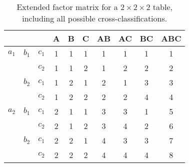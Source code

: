 \begin{table}[htb]
 \caption[Extended factor matrix for a $2\times 2\times2$ table]%
         {Extended factor matrix for a $2\times 2\times2$ table, including all possible cross-classifications.}\label{tab:mcadesign}\vspace{5pt}
\begin{center}
\begin{tabular}{lll | ccc ccc c}
 \hline
       &       &        &  A  &  B  &  C  &  AB &  AC &  BC & ABC \\ \hline
 $a_1$ & $b_1$ & $c_1$  &  1  &  1  &  1  &  1  &  1  &  1  &  1 \\
       &       & $c_2$  &  1  &  1  &  2  &  1  &  2  &  2  &  2 \\
       & $b_2$ & $c_1$  &  1  &  2  &  1  &  2  &  1  &  3  &  3 \\
       &       & $c_2$  &  1  &  2  &  2  &  2  &  2  &  4  &  4 \\
%
 $a_2$ & $b_1$ & $c_1$  &  2  &  1  &  1  &  3  &  3  &  1  &  5 \\
       &       & $c_2$  &  2  &  1  &  2  &  3  &  4  &  2  &  6 \\
       & $b_2$ & $c_1$  &  2  &  2  &  1  &  4  &  3  &  3  &  7 \\
       &       & $c_2$  &  2  &  2  &  2  &  4  &  4  &  4  &  8 \\
%
\end{tabular}
\end{center}
\end{table}
